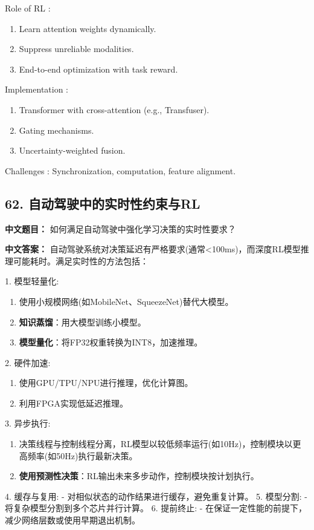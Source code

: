 \documentclass[10pt,a4paper]{ctexart}
\begin{document}
 Role of RL :
\begin{enumerate}
    \item Learn attention weights dynamically.
    \item Suppress unreliable modalities.
    \item End-to-end optimization with task reward.
\end{enumerate}

 Implementation :
\begin{enumerate}
    \item Transformer with cross-attention (e.g., Transfuser).
    \item Gating mechanisms.
    \item Uncertainty-weighted fusion.
\end{enumerate}

 Challenges : Synchronization, computation, feature alignment.

\subsection*{62. 自动驾驶中的实时性约束与RL}
\textbf{中文题目：} 如何满足自动驾驶中强化学习决策的实时性要求？

\textbf{中文答案：}  
自动驾驶系统对决策延迟有严格要求(通常<100ms)，而深度RL模型推理可能耗时。满足实时性的方法包括：

1.  模型轻量化:
\begin{enumerate}
       \item 使用小规模网络(如MobileNet、SqueezeNet)替代大模型。
       \item \textbf{知识蒸馏}：用大模型训练小模型。
       \item \textbf{模型量化}：将FP32权重转换为INT8，加速推理。
\end{enumerate}
2.  硬件加速:
\begin{enumerate}
       \item 使用GPU/TPU/NPU进行推理，优化计算图。
       \item 利用FPGA实现低延迟推理。
\end{enumerate}
3.  异步执行:
\begin{enumerate}
       \item 决策线程与控制线程分离，RL模型以较低频率运行(如10Hz)，控制模块以更高频率(如50Hz)执行最新决策。
       \item \textbf{使用预测性决策}：RL输出未来多步动作，控制模块按计划执行。
\end{enumerate}
4.  缓存与复用:
   - 对相似状态的动作结果进行缓存，避免重复计算。
5.  模型分割:
   - 将复杂模型分割到多个芯片并行计算。
6.  提前终止:
   - 在保证一定性能的前提下，减少网络层数或使用早期退出机制。
\end{document}

